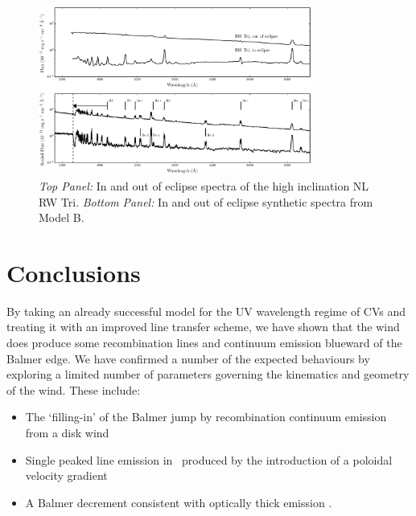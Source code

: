 \documentclass[preprint, a4paper, 11pt]{aastex}
\begin{document}
\begin{figure} %
\includegraphics[width=0.8\textwidth]{figures/fig13_eclipse.eps}
\caption{{\sl Top Panel:} In and out of eclipse spectra of the high
inclination NL RW Tri. {\sl Bottom Panel:} In and out of eclipse synthetic
spectra from Model B.}
\label{rwtricomp}
\end{figure} %








%
%


\section{Conclusions}

By taking an already successful model
for the UV wavelength regime of CVs and treating 
it with an improved line transfer scheme, we have shown
that the wind does produce some recombination lines
and continuum emission blueward of the Balmer edge.
We have confirmed a number of the expected behaviours
by exploring a limited number of parameters governing the
kinematics and geometry of the wind. These include:

\renewcommand{\labelitemi}{$\bullet$}
\begin{itemize}
	\item The `filling-in' of the Balmer jump \citep{KLWB98} by recombination 
	continuum emission from a disk wind
	\item Single peaked line emission in \ha\ produced by 
	the introduction of a poloidal velocity gradient \citep{MC96}
	\item A Balmer decrement consistent with optically thick emission \citep{elitzur1983}.
\end{itemize}
\smallskip
\end{document}
